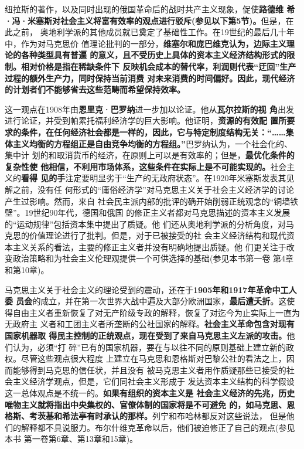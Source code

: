 纽拉斯的著作，以及同时出现的俄国革命后的战时共产主义现象，促使\textbf{路德维
  希·冯·米塞斯对社会主义将富有效率的观点进行驳斥(参见以下第5节)。}但是，在此之前，
奥地利学派的其他成员就已奠定了基础性工作。在19世纪的最后几十年中，作为对马克思价
值理论批判的一部分，\textbf{维塞尔和庞巴维克认为，边际主义理论的各种类型具有普遍
  的意义，且不受历史上具体的资本主义经济结构形式的限制。相对价格是指在稀缺条件下
  反映机会成本的替代率，利润则代表“迂回”生产过程的额外生产力，同时保持当前消费
  对未来消费的时间偏好。因此，现代经济的计划者们不能够省去这些范畴而希望保持效率。}

这一观点在1908年由\textbf{恩里克·巴罗纳}进一步加以论证。他从\textbf{瓦尔拉斯的视
  角}出发进行论证，并受到帕累托福利经济学的巨大影响。他证明，\textbf{资源的有效配
  置所要求的条件，在任何经济社会都是一样的，因此，它与特定制度结构无关：“……集
  体主义均衡的方程组正是自由竞争均衡的方程组。”}巴罗纳认为，一个社会化的、集中计
划的和取消货币的经济，在原则上可以是有效率的；但是，\textbf{最优化条件的复杂性使
  他相信，不利用市场体系，这些条件在实际上是不可能实现的。}社会主义的\textbf{看得
  见的手}注定要明显劣于“生产的无政府状态”。在1920年米塞斯发表其见解之前，没有任
何形式的“庸俗经济学”对马克思主义关于社会主义经济学的讨论产生过影响。然而，来自
社会民主派内部的批评的确开始削弱正统观念的“铜墙铁壁”。19世纪90年代，德国和俄国
的修正主义者都对马克思描述的资本主义发展的“运动规律”包括资本集中提出了质疑。他
们还从奥地利学派的分析角度，对马克思的价值理论进行了批判。但是，对于已被接受的社
会主义经济结构和现代资本主义关系的看法，主要的修正主义者并没有明确地提出质疑。他
们更关注于改变政治策略和为社会主义伦理观提供一个可供选择的基础(参见本书第一卷
第4章和第10章)。

马克思主义关于社会主义的理论受到的震动，还在于\textbf{1905年和1917年革命中工人委
  员会}的成立，并在第一次世界大战中遍及大部分欧洲国家，\textbf{最后遭夭折}。这使
得自由主义者重新恢复了对无产阶级专政的解释，恢复了对迄今为止实际上一直为无政府主
义者和工团主义者所垄断的公社国家的解释。\textbf{社会主义革命包含对现有国家机器取
  得民主控制的正统观点，现在受到了来自马克思主义左派的攻击。}他们认为，必须“打
碎”已有的国家机器，要在与以往不同的原则基础上建立新的政权。尽管这些观点很大程度
上建立在马克思和恩格斯对巴黎公社的看法之上，因而能够得到马克思的信任状，并且没有
被马克思主义者用作质疑那些已接受的社会主义经济学观点，但是，它们同社会主义形成于
发达资本主义结构的科学假设这一总体观点是不统一的。\textbf{如果有组织的资本主义是
  社会主义经济的先兆，历史唯物主义就将指出中央集权的、官僚体制的国家将是不可避免
  的，如马克思、恩格斯、考茨基和希法亭有时承认的那样。}列宁和布哈林都反对这些说法，
但是他们的解释都不具说服力。布尔什维克革命以后，他们被迫修正了自己的观点(参见本书
第一卷第6章、第13章和15章)。

